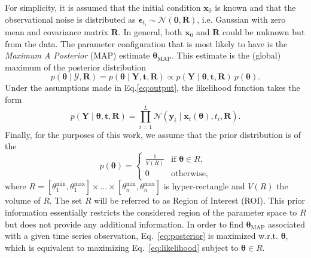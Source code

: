 For simplicity, it is assumed that the initial condition  $\mathbf{x}_{0}$ is known and that the observational noise is distributed as $\boldsymbol{\epsilon}_{t_{i}} \sim \mathcal{N}(\mathbf{0}, \mathbf{R})$, i.e. Gaussian with zero mean and covariance matrix $\mathbf{R}$. 
In general, both $\mathbf{x}_{0}$ and $\mathbf{R}$ could be unknown but   from the data. 
The parameter configuration that is most likely to have  is the \emph{Maximum A Posterior} (MAP) estimate $\boldsymbol{\theta}_{\text{MAP}}$.
This estimate is the (global) maximum  of the posterior distribution
\begin{equation}\label{eq:posterior}
   p(\boldsymbol{\theta} \mid \mathcal{Y}, \mathbf{R}) =  p(\boldsymbol{\theta} \mid \mathbf{Y}, \mathbf{t}, \mathbf{R}) \propto p(\mathbf{Y} \mid \boldsymbol{\theta}, \mathbf{t}, \mathbf{R}) \  p(\boldsymbol{\theta}).
\end{equation}
Under the assumptions made in Eq.\eqref{eq:output}, the likelihood function takes  the form
\begin{equation}\label{eq:likelihood}
    p(\mathbf{Y} \mid \boldsymbol{\theta}, \mathbf{t}, \mathbf{R}) = \prod_{i = 1}^{L} \mathcal{N}(\mathbf{y}_{i} \mid \mathbf{x}_{t}(\boldsymbol{\theta}), t_{i}, \mathbf{R}). 
\end{equation}
Finally, for the purposes of this work, we assume that the prior distribution is of the 
\begin{equation}
    p(\boldsymbol{\theta}) = 
    \begin{cases}
        \frac{1}{V(R)}   &\text{if } \boldsymbol{\theta} \in R, \\
        0                &\text{otherwise,}
    \end{cases}
\end{equation}
where $R = [\theta_{1}^{\text{min}}, \theta_{1}^{\text{max}}] \times \ldots \times [\theta_{n}^{\text{min}}, \theta_{n}^{\text{max}}]$ is  hyper-rectangle  and $V(R)$  the volume of $R$. 
The set $R$ will be referred to as Region of Interest (ROI).
This prior information essentially restricts the considered region of the parameter space to $R$ but does not provide any additional information.
In order to find  $\boldsymbol{\theta}_{\text{MAP}}$ associated with a given time series observation, Eq.~\eqref{eq:posterior} is maximized w.r.t. $\boldsymbol{\theta}$, which is equivalent to maximizing Eq.~\eqref{eq:likelihood} subject to $\boldsymbol{\theta} \in R$.

